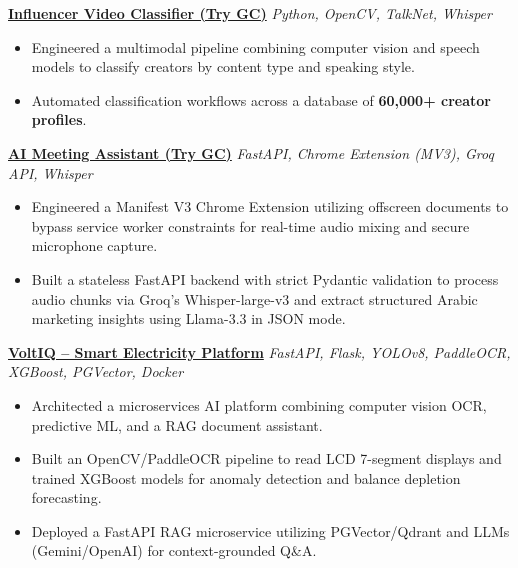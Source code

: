 \documentclass[a4paper,10pt]{article}
\begin{document}
\vspace{1mm}

\textbf{\href{https://github.com/Demro7/influencer-video-classifier}{Influencer Video Classifier (Try GC)}} \hfill \textit{Python, OpenCV, TalkNet, Whisper}
\begin{itemize}[noitemsep, topsep=0pt, leftmargin=*]
    \item Engineered a multimodal pipeline combining computer vision and speech models to classify creators by content type and speaking style.
    \item Automated classification workflows across a database of \textbf{60,000+ creator profiles}.
\end{itemize}

\vspace{1mm}

\textbf{\href{https://github.com/Demro7/ai-meeting-assistant}{AI Meeting Assistant (Try GC)}} \hfill \textit{FastAPI, Chrome Extension (MV3), Groq API, Whisper}
\begin{itemize}[noitemsep, topsep=0pt, leftmargin=*]
    \item Engineered a Manifest V3 Chrome Extension utilizing offscreen documents to bypass service worker constraints for real-time audio mixing and secure microphone capture.
    \item Built a stateless FastAPI backend with strict Pydantic validation to process audio chunks via Groq's Whisper-large-v3 and extract structured Arabic marketing insights using Llama-3.3 in JSON mode.
\end{itemize}

\vspace{1mm}

\textbf{\href{https://github.com/Demro7/VoltIQ-}{VoltIQ -- Smart Electricity Platform}} \hfill \textit{FastAPI, Flask, YOLOv8, PaddleOCR, XGBoost, PGVector, Docker}
\begin{itemize}[noitemsep, topsep=0pt, leftmargin=*]
    \item Architected a microservices AI platform combining computer vision OCR, predictive ML, and a RAG document assistant.
    \item Built an OpenCV/PaddleOCR pipeline to read LCD 7-segment displays and trained XGBoost models for anomaly detection and balance depletion forecasting.
    \item Deployed a FastAPI RAG microservice utilizing PGVector/Qdrant and LLMs (Gemini/OpenAI) for context-grounded Q\&A.
\end{itemize}
\end{document}
